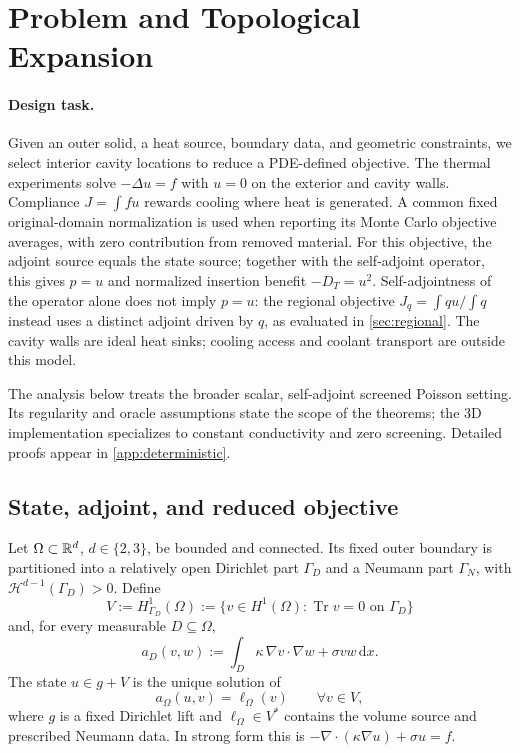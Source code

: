 \section{Problem and Topological Expansion}
\label{sec:problem}

\paragraph{Design task.}
Given an outer solid, a heat source, boundary data, and geometric constraints, we select interior cavity locations to reduce a PDE-defined objective. The thermal experiments solve $-\Delta u=f$ with $u=0$ on the exterior and cavity walls. Compliance $J=\int fu$ rewards cooling where heat is generated. A common fixed original-domain normalization is used when reporting its Monte Carlo objective averages, with zero contribution from removed material. For this objective, the adjoint source equals the state source; together with the self-adjoint operator, this gives $p=u$ and normalized insertion benefit $-D_T=u^2$. Self-adjointness of the operator alone does not imply $p=u$: the regional objective $J_q=\int qu/\int q$ instead uses a distinct adjoint driven by $q$, as evaluated in \cref{sec:regional}. The cavity walls are ideal heat sinks; cooling access and coolant transport are outside this model.

The analysis below treats the broader scalar, self-adjoint screened Poisson setting. Its regularity and oracle assumptions state the scope of the theorems; the 3D implementation specializes to constant conductivity and zero screening. Detailed proofs appear in \cref{app:deterministic}.

\subsection{State, adjoint, and reduced objective}

Let $\Omega\subset\mathbb{R}^d$, $d\in\{2,3\}$, be bounded and connected.  Its fixed
outer boundary is partitioned into a relatively open Dirichlet part
$\Gamma_D$ and a Neumann part $\Gamma_N$, with
$\mathcal H^{d-1}(\Gamma_D)>0$.  Define
\begin{equation}
 V:=H^1_{\Gamma_D}(\Omega)
 :=\{v\in H^1(\Omega):\operatorname{Tr}v=0
       \text{ on }\Gamma_D\}
\end{equation}
and, for every measurable $D\subseteq\Omega$,
\begin{equation}
 a_D(v,w):=\int_D
 \kappa\,\nabla v\!\cdot\!\nabla w+\sigma vw\,\mathrm dx.
 \label{eq:bilinear}
\end{equation}
The state $u\in g+V$ is the unique solution of
\begin{equation}
 a_\Omega(u,v)=\ell_\Omega(v)
 \qquad\forall v\in V,
 \label{eq:stateweak}
\end{equation}
where $g$ is a fixed Dirichlet lift and $\ell_\Omega\in V^*$ contains the
volume source and prescribed Neumann data.  In strong form this is
$-\nabla\!\cdot(\kappa\nabla u)+\sigma u=f$.


